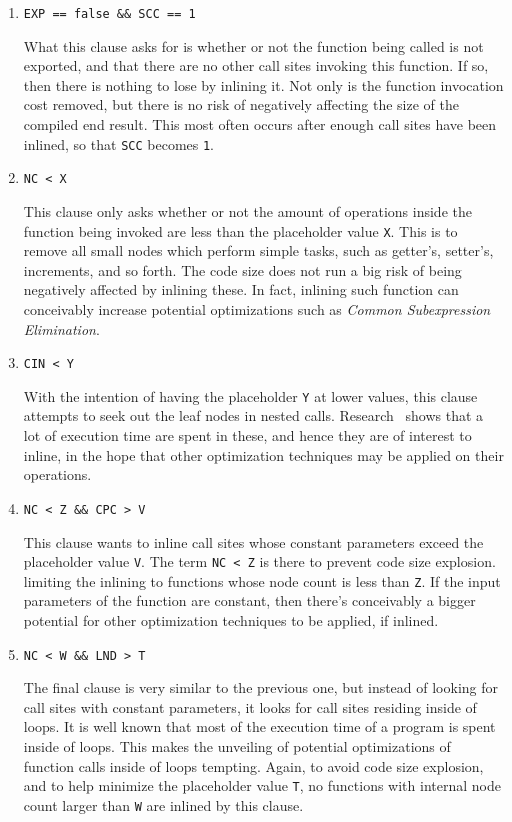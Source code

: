 \begin{enumerate}

	\item \lstinline!EXP == false && SCC == 1!

What this clause asks for is whether or not the function being called is not
exported, and that there are no other call sites invoking this function. If so,
then there is nothing to lose by inlining it. Not only is the function
invocation cost removed, but there is no risk of negatively affecting the size
of the compiled end result. This most often occurs after enough call sites have
been inlined, so that \lstinline|SCC| becomes \lstinline|1|.

	\item \lstinline!NC < X!
	\label{sub:meth:cnf_clause2}

This clause only asks whether or not the amount of operations inside the
function being invoked are less than the placeholder value \lstinline!X!. This
is to remove all small nodes which perform simple tasks, such as getter's,
setter's, increments, and so forth. The code size does not run a big risk of
being negatively affected by inlining these. In fact, inlining such function can
conceivably increase potential optimizations such as \textit{Common
Subexpression Elimination}.

	\item \lstinline!CIN < Y!
	\label{sub:meth:cnf_clause3}

With the intention of having the placeholder \lstinline!Y! at lower values, this
clause attempts to seek out the leaf nodes in nested calls.
Research~\cite{AdaptvCompilAndInlingWaterman} shows that a lot of execution time
are spent in these, and hence they are of interest to inline, in the hope that
other optimization techniques may be applied on their operations.

	\item \lstinline!NC < Z && CPC > V!
	\label{sub:meth:cnf_clause4}

This clause wants to inline call sites whose constant parameters exceed the
placeholder value \lstinline!V!. The term \lstinline|NC < Z| is there to prevent
code size explosion. limiting the inlining to functions whose node count is less
than \lstinline|Z|. If the input parameters of the function are constant, then
there's conceivably a bigger potential for other optimization techniques to be
applied, if inlined.

	\item \lstinline!NC < W && LND > T!
	\label{sub:meth:cnf_clause5}

The final clause is very similar to the previous one, but instead of looking for
call sites with constant parameters, it looks for call sites residing inside of
loops. It is well known that most of the execution time of a program is spent
inside of loops. This makes the unveiling of potential optimizations of function
calls inside of loops tempting. Again, to avoid code size explosion, and to help
minimize the placeholder value \lstinline|T|, no functions with internal node
count larger than \lstinline|W| are inlined by this clause.

\end{enumerate}

